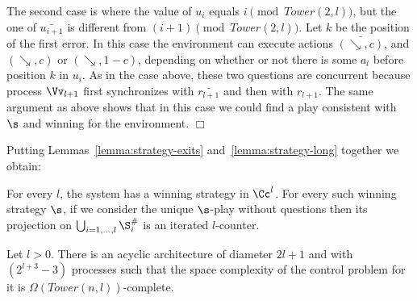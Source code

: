 \documentclass{llncs}
\newcommand{\inctest}{\searrow}
\newcommand{\Tower}{\mathit{Tower}}
\renewenvironment{proof}{{\em Proof. }}{\nopagebreak
  \hspace*{\fill}$\Box$}
\begin{document}
\begin{proof}
  The second case is where the value of $u_i$ equals $i
  \pmod{\Tower(2,l)}$, but the one of $\bar{u_{i+1}}$ is different from
  $(i+1) \pmod{\Tower(2,l)}$. Let $k$ be the position of the first
  error. In this case the environment can execute actions
  $\bar{(\inctest,c)}$, and $(\inctest,c)$ or $(\inctest,1-c)$, depending
  on whether or not there is some $a_l$ before position $k$ in
  $u_i$. As in the case above, these two questions are concurrent because
  process $\Vv_{l+1}$ first synchronizes with $\bar{r_{l+1}}$ and then with
  $r_{l+1}$. The same argument as above  shows that in
  this case we could find a play consistent with $\s$ and
  winning for the environment. 
\end{proof}

Putting Lemmas~\ref{lemma:strategy-exits}
and~\ref{lemma:strategy-long} together we obtain:

\medskip

\begin{proposition}\label{prop:game corrctness}
  For every $l$, the system has a winning strategy in $\Cc^l$. For
  every such winning strategy $\s$, if we consider the unique $\s$-play without
  questions then its projection on $\bigcup_{i=1,\ldots,l} \S^\#_i$
  is an iterated $l$-counter.
\end{proposition}

\medskip

\begin{theorem}\label{th:nonelem}
  Let $l>0$.  There is an acyclic architecture of diameter $2l+1$ and
  with $(2^{l+3}-3)$ processes such that the space complexity of the control
  problem for it is $\Omega(\Tower(n,l))$-complete. 
\end{theorem}

\medskip
\end{document}
